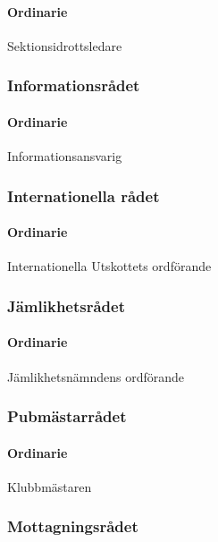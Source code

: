 \documentclass{dgovdoc}
\begin{document}
\paragraph{Ordinarie}

Sektionsidrottsledare

\subsubsection{Informationsrådet}

\paragraph{Ordinarie}

Informationsansvarig

\subsubsection{Internationella rådet}

\paragraph{Ordinarie}

Internationella Utskottets ordförande

\subsubsection{Jämlikhetsrådet}

\paragraph{Ordinarie}

Jämlikhetsnämndens ordförande

\subsubsection{Pubmästarrådet}

\paragraph{Ordinarie}

Klubbmästaren

\subsubsection{Mottagningsrådet}
\end{document}
